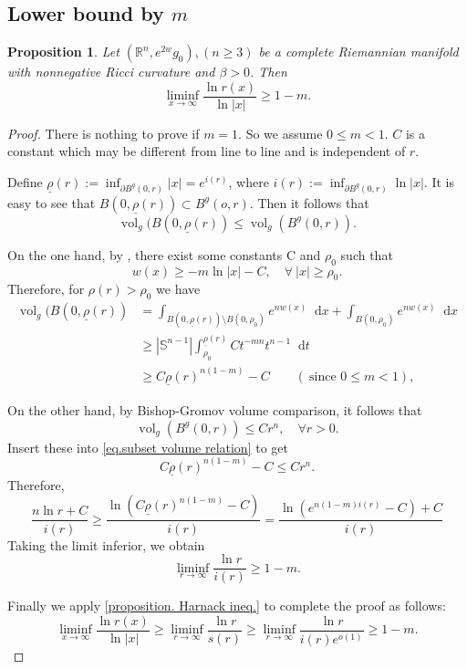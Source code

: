 \documentclass[12pt]{amsart}
\theoremstyle{plain}
\newtheorem{proposition}[theorem]{Proposition}
\theoremstyle{definition}
\theoremstyle{remark}     %
\numberwithin{equation}{section}
\newcommand{\dd}{\mathop{}\!\mathrm{d}}%
\newcommand{\dx}{\mathop{}\!\mathrm{d}x}
\begin{document}
\subsection{Lower bound by $m$}
\begin{proposition}\label{proposition. second part}
    Let $(\mathbb{R}^n,e^{2w}g_0), (n\geq 3)$ be a complete Riemannian manifold with nonnegative Ricci curvature and $\beta>0$.
    Then 
    \[
        \liminf_{x\to \infty}\frac{\ln r(x)}{\ln |x|}\geq 1-m.
    \]

\end{proposition}
\begin{proof}   
There is nothing to prove if $m=1$. So we assume $0\leq m<1$. $C$ is a constant which may be different from line to line and is independent of $r$.
    
Define $\underline{\rho}(r):=\inf_{\partial B^g(0,r) }|x|=e^{i(r)}$, where $i(r):=\inf_{\partial B^g(0,r)}\ln |x| $. It is easy to see that 
    $B(0,\underline{\rho}(r))\subset B^g(o,r)$. Then it follows that
    \begin{equation}\label{eq.subset volume relation}
        \operatorname{vol}_g(B(0,\underline{\rho}(r))
        \leq \operatorname{vol}_g(B^g(0,r)).
    \end{equation}

    On the one hand, by \cite[Theorem 1.3]{MQ}, there exist some constants C and $\rho_0$ such that
    \begin{equation}\label{ineq. pointwise lower bound of phi}
        w(x)\geq -m\ln |x|-C,\quad \forall \ |x| \geq \rho_0.
    \end{equation}
    Therefore, for $\rho(r)> \rho_0$ we have
    \begin{align*}
        \operatorname{vol}_g
        (B(0,\underline{\rho}(r))
        &=\int_{B(0,\underline{\rho}(r))\setminus B(0,\rho_0)} e^{nw(x)}\dx
        +\int_{B(0,\rho_0)} e^{nw(x)}\dx\\
        &\geq |\mathbb{S}^{n-1}|\int_{\rho_0}^{\underline{\rho}(r)}C t^{-mn}t^{n-1}\dd t
        \\
        &\geq
            C\underline{\rho}(r)^{n(1-m)}-C \quad\quad(\ \text{since } 0\leq m<1), 
    \end{align*}
    
    On the other hand, by Bishop-Gromov volume comparison, it follows that
    \[
        \operatorname{vol}_g(B^g(0,r))\leq Cr^n,\quad \forall r>0.
    \]
    Insert these into \cref{eq.subset volume relation} to get
    \[
        C\underline{\rho}(r)^{n(1-m)}-C\leq C r^n.
    \]
    Therefore,
    \[
        \frac{n\ln r+C}{i(r)}\geq \frac{\ln(C\underline{\rho}(r)^{n(1-m)}-C)}{i(r)}=\frac{\ln (e^{n(1-m)i(r) }-C)+C}{i(r)}
    \]
Taking the limit inferior, we obtain
    \[
        \liminf_{r\to \infty}\frac{\ln r}{i(r)}\geq 1-m.
    \]

Finally we apply \cref{proposition. Harnack ineq.} to complete the proof as follows:
    \[
        \liminf_{x\to\infty}\frac{\ln r(x)}{\ln |x|}\geq 
        \liminf_{r\to \infty}\frac{\ln r}{s(r)}
        \geq \liminf_{r\to \infty}\frac{\ln r}{i(r)e^{o(1)}}\geq 1-m.
    \]
\end{proof}
\end{document}

